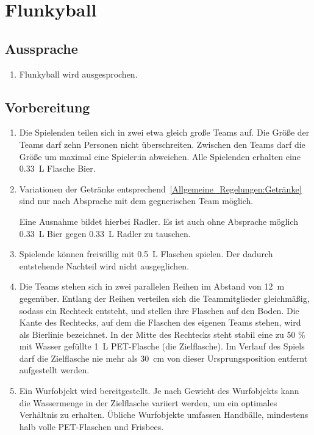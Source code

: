 \chapter{Flunkyball}
\section{Aussprache}
\begin{enumerate}[label={(\arabic*)}]
    \item
    Flunkyball wird  ausgesprochen.
\end{enumerate}

\section{Vorbereitung}
\begin{enumerate}[label={(\arabic*)}]
    \item
    Die Spielenden teilen sich in zwei etwa gleich große Teams auf.
    Die Größe der Teams darf zehn Personen nicht überschreiten.
    Zwischen den Teams darf die Größe um maximal eine Spieler:in abweichen.
    Alle Spielenden erhalten eine \SI{0,33}{\liter} Flasche Bier.

    \item Variationen der Getränke entsprechend~\ref{Allgemeine_Regelungen:Getränke} sind nur nach Absprache mit dem gegnerischen Team möglich.

    Eine Ausnahme bildet hierbei Radler.
    Es ist auch ohne Absprache möglich \SI{0,33}{\liter} Bier gegen \SI{0,33}{\liter} Radler zu tauschen.

    \item
    Spielende können freiwillig mit \SI{0,5}{\liter} Flaschen spielen.
    Der dadurch entstehende Nachteil wird nicht ausgeglichen.

    \item\label{Flunkyball:Vorbereitung:Spielfeld}
    Die Teams stehen sich in zwei parallelen Reihen im Abstand von \SI{12}{\meter} gegenüber.
    Entlang der Reihen verteilen sich die Teammitglieder gleichmäßig, sodass ein Rechteck entsteht, und stellen ihre Flaschen auf den Boden.
    Die Kante des Rechtecks, auf dem die Flaschen des eigenen Teams stehen, wird als \glqq{}Bierlinie\grqq{} bezeichnet.
    In der Mitte des Rechtecks steht stabil eine zu 50 \% mit Wasser gefüllte \SI{1}{\liter} PET-Flasche (die \glqq{}Zielflasche\grqq{}).
    Im Verlauf des Spiels darf die Zielflasche nie mehr als \SI{30}{\centi\meter} von dieser Ursprungsposition entfernt aufgestellt werden.

    \item
    Ein Wurfobjekt wird bereitgestellt.
    Je nach Gewicht des Wurfobjekts kann die Wassermenge in der Zielflasche variiert werden, um ein optimales Verhältnis zu erhalten.
    Übliche Wurfobjekte umfassen Handbälle, mindestens halb volle PET-Flaschen und Frisbees.
\end{enumerate}

